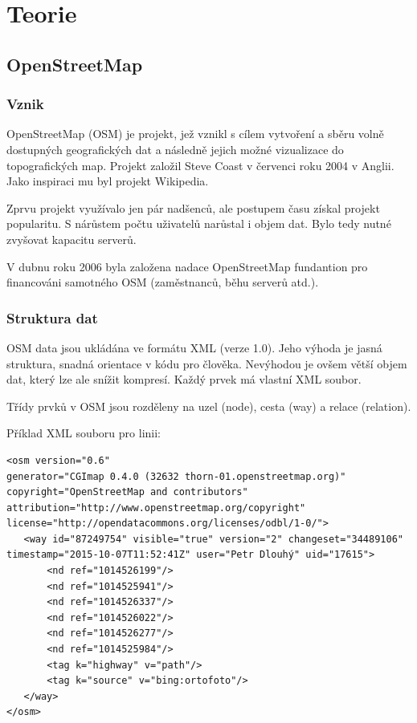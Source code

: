 \chapter{Teorie}
\label{2-Teorie}

\section{OpenStreetMap}
\label{OpenStreetMap}

\subsection{Vznik}
\label{vznik}
OpenStreetMap (OSM) je projekt, jež vznikl s cílem vytvoření a sběru 
volně dostupných geografických dat a následně jejich možné vizualizace
do topografických map. Projekt založil Steve Coast v červenci roku 
2004 v Anglii. Jako inspiraci mu byl projekt Wikipedia. 

Zprvu projekt využívalo jen pár nadšenců, ale postupem času získal 
projekt popularitu. S nárůstem počtu uživatelů narůstal i objem dat. 
Bylo tedy nutné zvyšovat kapacitu serverů. 

V dubnu roku 2006 byla založena nadace OpenStreetMap fundantion pro financováni 
samotného OSM (zaměstnanců, běhu serverů atd.). \cite{wikiOSM}


\subsection{Struktura dat}
\label{struktura dat}

OSM data jsou ukládána ve formátu XML (verze 1.0). Jeho výhoda je jasná 
struktura, snadná orientace v kódu pro člověka. Nevýhodou je ovšem větší objem 
dat, který lze ale snížit kompresí. 
Každý prvek má vlastní XML soubor. 

Třídy prvků v OSM jsou rozděleny na uzel (node), cesta (way) a 
relace (relation).

Příklad XML souboru pro linii:

{\scriptsize
\begin{lstlisting}
<osm version="0.6" 
generator="CGImap 0.4.0 (32632 thorn-01.openstreetmap.org)" copyright="OpenStreetMap and contributors" attribution="http://www.openstreetmap.org/copyright" license="http://opendatacommons.org/licenses/odbl/1-0/">
   <way id="87249754" visible="true" version="2" changeset="34489106" timestamp="2015-10-07T11:52:41Z" user="Petr Dlouhý" uid="17615">
       <nd ref="1014526199"/>
       <nd ref="1014525941"/>
       <nd ref="1014526337"/>
       <nd ref="1014526022"/>
       <nd ref="1014526277"/>
       <nd ref="1014525984"/>
       <tag k="highway" v="path"/>
       <tag k="source" v="bing:ortofoto"/>
   </way>
</osm>
\end{lstlisting}
}


